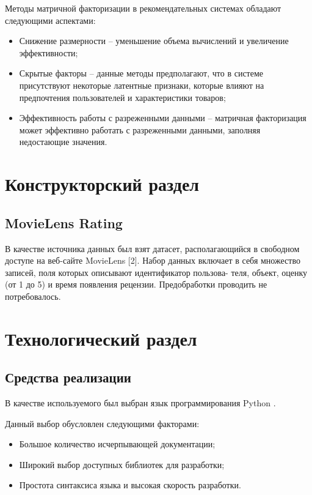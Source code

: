 \documentclass[12pt]{report}
\begin{document}
Методы матричной факторизации в рекомендательных системах обладают следующими аспектами:

\begin{itemize}
	\item Снижение размерности -- уменьшение объема вычислений и увеличение эффективности;
	\item Скрытые факторы -- данные методы предполагают, что в системе присутствуют некоторые латентные признаки, которые влияют на предпочтения пользователей и характеристики товаров;
	\item Эффективность работы с разреженными данными -- матричная факторизация может эффективно работать с разреженными данными, заполняя недостающие значения.
\end{itemize}

\pagebreak

\chapter{Конструкторский раздел}

\section{MovieLens Rating}
В качестве источника данных был взят датасет, располагающийся в свободном доступе на веб-сайте MovieLens [2]. Набор данных включает в себя множество записей, поля которых описывают идентификатор пользова- теля, объект, оценку (от 1 до 5) и время появления рецензии. Предобработки проводить не потребовалось.


\pagebreak

\chapter{Технологический раздел}

\section{Средства реализации}

В качестве используемого был выбран язык программирования Python \cite{Python}.

Данный выбор обусловлен следующими факторами:
\begin{itemize}
	\item Большое количество исчерпывающей документации;
	\item Широкий выбор доступных библиотек для разработки;
	\item Простота синтаксиса языка и высокая скорость разработки.
\end{itemize} 
\end{document}
